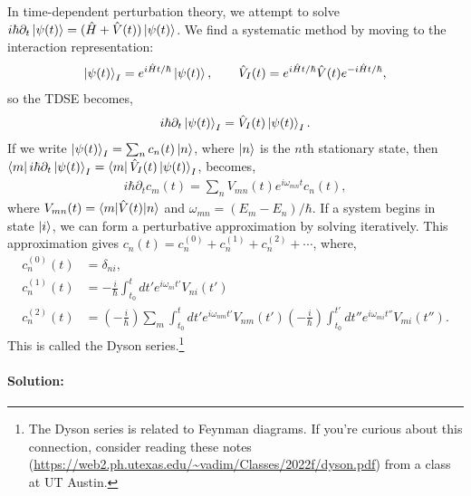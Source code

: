 \documentclass[10pt]{article}
\newcommand{\1}{\mathbf 1}
\begin{document}
In time-dependent perturbation theory, we attempt to solve $i\hbar \partial_t \ket{\psi(t)} = (\hat H + \hat V(t))\ket{\psi(t)}$.
We find a systematic method by moving to the interaction representation:
\begin{align}
	\ket{\psi(t)}_I 
	=
	e^{i \hat H t/\hbar}\ket{\psi(t)},
	\qquad
	\hat V_I(t)
	=
	e^{i \hat H t/\hbar} \hat V(t)
	e^{-i \hat H t/\hbar},
\end{align}
so the TDSE becomes,
\begin{align}
	i \hbar \partial_t \ket{\psi(t)}_I 
	=
	\hat V_I(t) \ket{\psi(t)}_I.
\end{align}
If we write $\ket{\psi(t)}_I = \sum_n c_n(t) \ket{n}$, where $\ket{n}$ is the $n$th stationary state, then 
$\bra{m} i \hbar \partial_t \ket{\psi(t)}_I = \bra{m} \hat V_I(t) \ket{\psi(t)}_I$, becomes,
\begin{align}
	i \hbar \partial_t c_m(t)
	=
	\sum_{n} 
	V_{mn}(t) e^{i \omega_{mn} t} c_n(t),
\end{align}
where $V_{mn}(t) = \braket{m | \hat V(t)|n}$ and $\omega_{mn} = (E_m - E_n)/\hbar$.
If a system begins in state $\ket{i}$, we can form a perturbative approximation by solving iteratively.
This approximation gives $c_n(t) = c_n^{(0)} +c_n^{(1)} +c_n^{(2)} +\cdots$, where,
\begin{align}
	c_n^{(0)}(t)
	&=
	\delta_{ni},
	\\
	c_n^{(1)}(t)
	&=
	-\frac{i}{\hbar}
	\int_{t_0}^t dt' e^{i \omega_{ni} t'} V_{ni}(t')
	\\
	c_n^{(2)}(t)
	&=
	\left(-\frac{i}{\hbar}\right)
	\sum_{m}
	\int_{t_0}^t
	dt'
	e^{i \omega_{nm}t'}
	V_{nm} (t')
	\left(-\frac{i}{\hbar}\right)
	\int_{t_0}^{t'}
	dt''
	e^{i \omega_{mi}t''}
	V_{mi}(t'').
\end{align}
This is called the Dyson series.\footnote{
	The Dyson series is related to Feynman diagrams. If you're curious about this connection, consider reading these notes (\url{https://web2.ph.utexas.edu/~vadim/Classes/2022f/dyson.pdf}) from a class at UT Austin.
}

\paragraph{Solution:}
\end{document}
